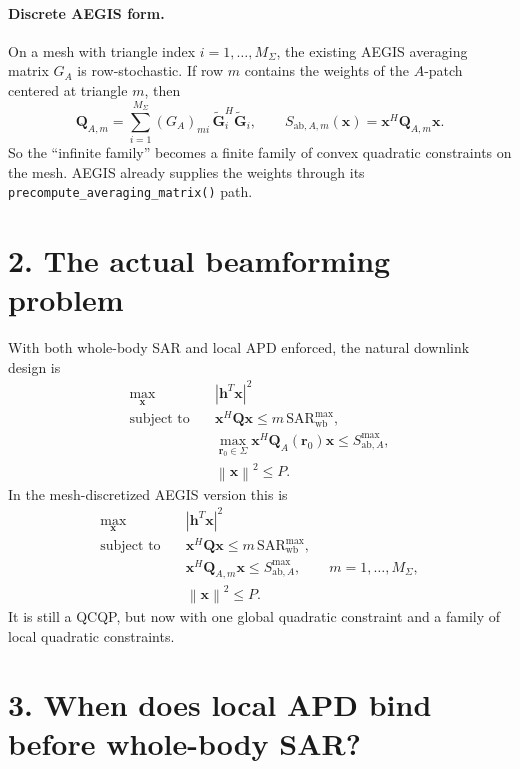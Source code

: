 \documentclass[11pt]{article}
\newcommand{\rr}{\mathbf{r}}
\newcommand{\x}{\mathbf{x}}
\newcommand{\hvec}{\mathbf{h}}
\newcommand{\Q}{\mathbf{Q}}
\newcommand{\Gt}{\widetilde{\mathbf{G}}}
\newcommand{\Sigmaset}{\Sigma}
\newcommand{\SARwb}{\mathrm{SAR}_{\mathrm{wb}}}
\newcommand{\norm}[1]{\left\lVert #1 \right\rVert}
\newcommand{\abs}[1]{\left\lvert #1 \right\rvert}
\begin{document}
\paragraph{Discrete AEGIS form.}
On a mesh with triangle index $i=1,\dots,M_\Sigma$, the existing AEGIS
averaging matrix $G_A$ is row-stochastic. If row $m$ contains the weights of
the $A$-patch centered at triangle $m$, then
\begin{equation}
  \Q_{A,m}
  = \sum_{i=1}^{M_\Sigma} (G_A)_{mi}\,
    \Gt_i^H \Gt_i,
  \qquad
  S_{\mathrm{ab},A,m}(\x) = \x^H \Q_{A,m}\x.
\end{equation}
So the ``infinite family'' becomes a finite family of convex quadratic
constraints on the mesh. AEGIS already supplies the weights through its
\texttt{precompute\_averaging\_matrix()} path.

\section*{2. The actual beamforming problem}

With both whole-body SAR and local APD enforced, the natural downlink design is
\begin{equation}
  \begin{aligned}
    \max_{\x} \quad & \abs{\hvec^T \x}^2 \\
    \text{subject to} \quad
    & \x^H \Q \x \le m\,\SARwb^{\max}, \\
    & \max_{\rr_0 \in \Sigmaset} \x^H \Q_A(\rr_0)\x \le S_{\mathrm{ab},A}^{\max}, \\
    & \norm{\x}^2 \le P.
  \end{aligned}
  \label{eq:dual-problem}
\end{equation}
In the mesh-discretized AEGIS version this is
\begin{equation}
  \begin{aligned}
    \max_{\x} \quad & \abs{\hvec^T \x}^2 \\
    \text{subject to} \quad
    & \x^H \Q \x \le m\,\SARwb^{\max}, \\
    & \x^H \Q_{A,m}\x \le S_{\mathrm{ab},A}^{\max},
      \qquad m=1,\dots,M_\Sigma, \\
    & \norm{\x}^2 \le P.
  \end{aligned}
  \label{eq:dual-problem-discrete}
\end{equation}
It is still a QCQP, but now with one global quadratic constraint and a family
of local quadratic constraints.

\section*{3. When does local APD bind before whole-body SAR?}
\end{document}
